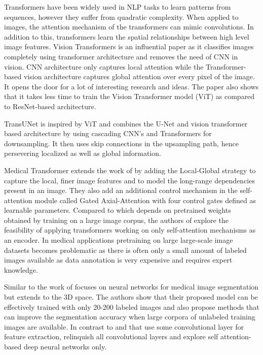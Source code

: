 \par
Transformers have been widely used in NLP tasks to learn patterns from sequences, however they suffer from quadratic complexity. When applied to images, the attention mechanism of the transformers can mimic convolutions. In addition to this, transformers learn the spatial relationships between high level image features. Vision Transformers \citep{transformers-2020-dosovitskiy} is an influential paper as it classifies images completely using transformer architecture and removes the need of CNN in vision. CNN architecture only captures local attention while the Transformer-based vision architecture captures global attention over every pixel of the image.  It opens the door for a lot of interesting research and ideas. The paper also shows that it takes less time to train the Vision Transformer model (ViT) as compared to ResNet-based architecture.

\par
TransUNet \citep{transunet-2021-chen} is inspired by ViT \citep{transformers-2020-dosovitskiy} and combines the U-Net and vision transformer based architecture by using cascading CNN’s and Transformers for downsampling. It then uses skip connections in the upsampling path, hence persevering localized as well as global information.

\par
Medical Transformer \citep{medical_transformer-2021-valanarasu} extends the work of \citep{transformers-2020-dosovitskiy} by adding the Local-Global strategy to capture the local, finer image features and to model the long-range  dependencies present in an image. They also add an additional control mechanism in the self-attention module called Gated Axial-Attention with four control gates defined as learnable parameters. Compared to \citep{transunet-2021-chen} which depends on pretrained weights obtained by training on a large image corpus, the authors of \citep{medical_transformer-2021-valanarasu} explore the feasibility of applying transformers working on only self-attention mechanisms as an encoder. In medical applications pretraining on large large-scale image datasets becomes problematic as there is often only a small amount of labeled images available as data annotation is very expensive and requires expert knowledge.

\par
Similar to \citep{medical_transformer-2021-valanarasu} the work of \citep{convolution_free-2021-karimi} focuses on neural networks for medical image segmentation but extends to the 3D space. The authors show that their proposed model can be effectively trained with only 20-200 labeled images and also propose methods that can improve the segmentation accuracy when large corpora of unlabeled training images are available. In contrast to \citep{medical_transformer-2021-valanarasu} and \citep{transformers-2020-dosovitskiy} that use some convolutional layer for feature extraction, \citep{convolution_free-2021-karimi} relinquish all convolutional layers and explore self attention-based deep neural networks only.


